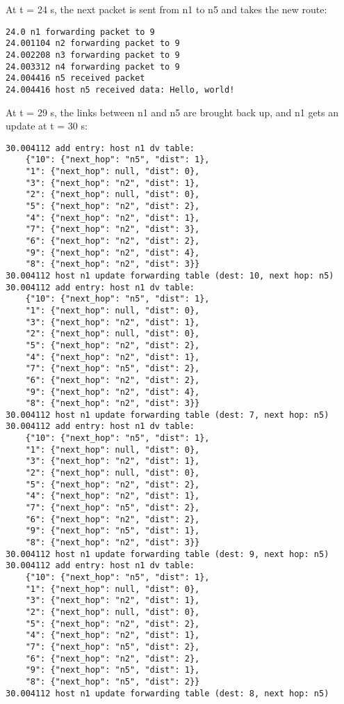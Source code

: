 \documentclass[11pt]{article}
\begin{document}
At t = 24 s, the next packet is sent from n1 to n5 and takes the new route:

\begin{lstlisting}
24.0 n1 forwarding packet to 9
24.001104 n2 forwarding packet to 9
24.002208 n3 forwarding packet to 9
24.003312 n4 forwarding packet to 9
24.004416 n5 received packet
24.004416 host n5 received data: Hello, world!
\end{lstlisting}

At t = 29 s, the links between n1 and n5 are brought back up, and n1 gets an update at t = 30 s:

\begin{lstlisting}
30.004112 add entry: host n1 dv table:
	{"10": {"next_hop": "n5", "dist": 1},
	"1": {"next_hop": null, "dist": 0},
	"3": {"next_hop": "n2", "dist": 1},
	"2": {"next_hop": null, "dist": 0},
	"5": {"next_hop": "n2", "dist": 2},
	"4": {"next_hop": "n2", "dist": 1},
	"7": {"next_hop": "n2", "dist": 3},
	"6": {"next_hop": "n2", "dist": 2},
	"9": {"next_hop": "n2", "dist": 4},
	"8": {"next_hop": "n2", "dist": 3}}
30.004112 host n1 update forwarding table (dest: 10, next hop: n5)
30.004112 add entry: host n1 dv table:
	{"10": {"next_hop": "n5", "dist": 1},
	"1": {"next_hop": null, "dist": 0},
	"3": {"next_hop": "n2", "dist": 1},
	"2": {"next_hop": null, "dist": 0},
	"5": {"next_hop": "n2", "dist": 2},
	"4": {"next_hop": "n2", "dist": 1},
	"7": {"next_hop": "n5", "dist": 2},
	"6": {"next_hop": "n2", "dist": 2},
	"9": {"next_hop": "n2", "dist": 4},
	"8": {"next_hop": "n2", "dist": 3}}
30.004112 host n1 update forwarding table (dest: 7, next hop: n5)
30.004112 add entry: host n1 dv table:
	{"10": {"next_hop": "n5", "dist": 1},
	"1": {"next_hop": null, "dist": 0},
	"3": {"next_hop": "n2", "dist": 1},
	"2": {"next_hop": null, "dist": 0},
	"5": {"next_hop": "n2", "dist": 2},
	"4": {"next_hop": "n2", "dist": 1},
	"7": {"next_hop": "n5", "dist": 2},
	"6": {"next_hop": "n2", "dist": 2},
	"9": {"next_hop": "n5", "dist": 1},
	"8": {"next_hop": "n2", "dist": 3}}
30.004112 host n1 update forwarding table (dest: 9, next hop: n5)
30.004112 add entry: host n1 dv table:
	{"10": {"next_hop": "n5", "dist": 1},
	"1": {"next_hop": null, "dist": 0},
	"3": {"next_hop": "n2", "dist": 1},
	"2": {"next_hop": null, "dist": 0},
	"5": {"next_hop": "n2", "dist": 2},
	"4": {"next_hop": "n2", "dist": 1},
	"7": {"next_hop": "n5", "dist": 2},
	"6": {"next_hop": "n2", "dist": 2},
	"9": {"next_hop": "n5", "dist": 1},
	"8": {"next_hop": "n5", "dist": 2}}
30.004112 host n1 update forwarding table (dest: 8, next hop: n5)
\end{lstlisting}
\end{document}
